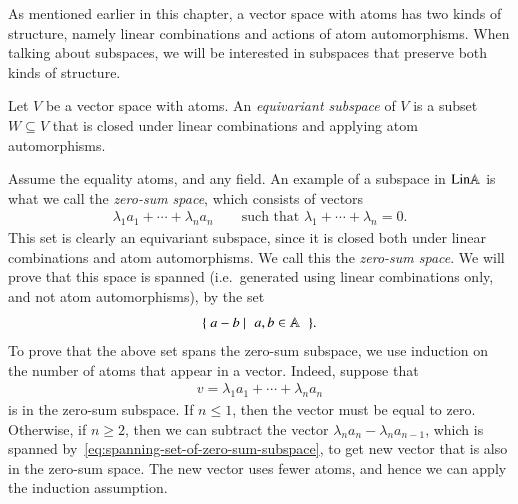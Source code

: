 As mentioned earlier in this chapter, a  vector space with atoms has two kinds of structure, namely linear combinations and actions of atom automorphisms. 
When talking about subspaces, we will be interested in subspaces that preserve both kinds of structure. 
\begin{definition}
     Let $V$ be a vector space with atoms. An \emph{equivariant subspace} of $V$ is a subset $W \subseteq V$ that is closed under linear combinations and applying atom automorphisms.  
\end{definition}



\begin{myexample}\label{ex:zero-sum-space}
    Assume the equality atoms, and any field. An example of a subspace in $\mathrm{Lin} \mathbb A$ is what we call the \emph{zero-sum space}, which consists of vectors 
    \begin{align*}
     \lambda_1 a_1 + \cdots + \lambda_n a_n
     \qquad \text{such that }
     \lambda_1 + \cdots + \lambda_n = 0.
    \end{align*} 
    This set is clearly an equivariant subspace, since it is closed both under linear combinations and atom automorphisms.
    We call this the \emph{zero-sum space}. We will prove that this  space is spanned (i.e.~generated using linear combinations only, and not atom automorphisms), by the set 
    \begin{align}\label{eq:spanning-set-of-zero-sum-subspace}
    \setbuild{ a -b}{$a,b \in \atoms$}.
    \end{align}
    To prove that the above set spans the zero-sum subspace, we  use induction on the number of atoms that appear in a vector. Indeed, suppose that 
    \begin{align*}
    v = \lambda_1 a_1 + \cdots + \lambda_n a_n
    \end{align*}
    is in the zero-sum subspace. If $n \leq 1$, then the  vector must be equal to zero. Otherwise, if $n \geq 2$, then we can  subtract the vector  $\lambda_n a_n - \lambda_n {a_{n-1}}$, which is spanned by~\eqref{eq:spanning-set-of-zero-sum-subspace},  to get new vector that is also in the zero-sum space. The new vector uses fewer atoms, and hence we can apply the induction assumption.


\end{myexample}
